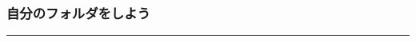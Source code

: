 \documentclass[text01.tex]{subfiles}
\begin{document}
  
  
  
  
  
  
  
  
    



%
%
\subsubsection{自分のフォルダをしよう}
\hrule\vspace*{5mm}
\end{document}
